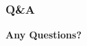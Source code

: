 \documentclass[notheorems, aspectratio=54]{beamer}
\begin{document}
%
%
%
%
%
\begin{frame}
	\frametitle{Q\&A}
    \vspace{20pt}
    \begin{center}
        \huge \textbf{Any Questions?}
    \end{center}

\end{frame}
\end{document}
